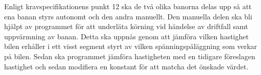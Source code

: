 Enligt kravspecifikationens punkt 12 ska de två olika banorna delas upp så att
ena banan styrs autonomt och den andra manuellt.  Den manuella delen ska bli
hjälpt av programmet för att underläta körning vid händelse av driftfall samt
uppvärmning av banan.  Detta ska uppnås genom att jämföra vilken hastighet bilen
erhåller i ett visst segment styrt av vilken spänningspåläggning som verkar på
bilen.  Sedan ska programmet jämföra hastigheten med en tidigare föreslagen
hastighet och sedan modifiera en konstant för att matcha det önskade värdet.
